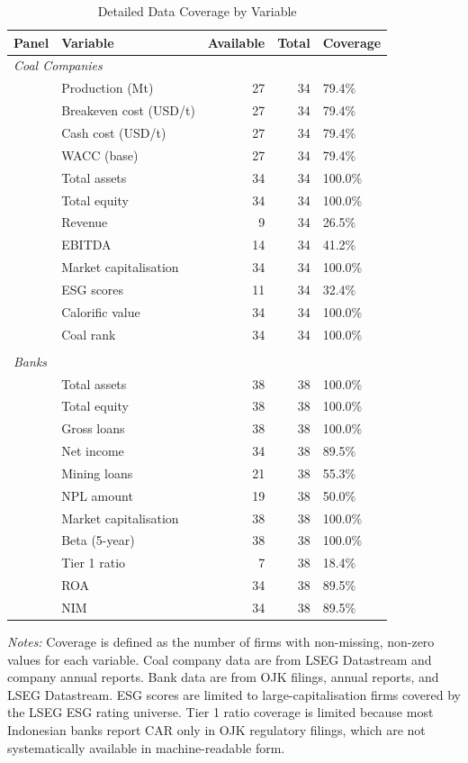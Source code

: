 \begin{table}[htbp]
\centering
\caption{Detailed Data Coverage by Variable}
\label{tab:data_coverage_detail_full}
\footnotesize
\begin{tabular}{llrrl}
\toprule
Panel & Variable & Available & Total & Coverage \\
\midrule
\multicolumn{5}{l}{\textit{Coal Companies}} \\[2pt]
 & Production (Mt) & 27 & 34 & 79.4\% \\
 & Breakeven cost (USD/t) & 27 & 34 & 79.4\% \\
 & Cash cost (USD/t) & 27 & 34 & 79.4\% \\
 & WACC (base) & 27 & 34 & 79.4\% \\
 & Total assets & 34 & 34 & 100.0\% \\
 & Total equity & 34 & 34 & 100.0\% \\
 & Revenue & 9 & 34 & 26.5\% \\
 & EBITDA & 14 & 34 & 41.2\% \\
 & Market capitalisation & 34 & 34 & 100.0\% \\
 & ESG scores & 11 & 34 & 32.4\% \\
 & Calorific value & 34 & 34 & 100.0\% \\
 & Coal rank & 34 & 34 & 100.0\% \\
\\[4pt]
\multicolumn{5}{l}{\textit{Banks}} \\[2pt]
 & Total assets & 38 & 38 & 100.0\% \\
 & Total equity & 38 & 38 & 100.0\% \\
 & Gross loans & 38 & 38 & 100.0\% \\
 & Net income & 34 & 38 & 89.5\% \\
 & Mining loans & 21 & 38 & 55.3\% \\
 & NPL amount & 19 & 38 & 50.0\% \\
 & Market capitalisation & 38 & 38 & 100.0\% \\
 & Beta (5-year) & 38 & 38 & 100.0\% \\
 & Tier 1 ratio & 7 & 38 & 18.4\% \\
 & ROA & 34 & 38 & 89.5\% \\
 & NIM & 34 & 38 & 89.5\% \\
\bottomrule
\end{tabular}

\smallskip
\noindent \textit{Notes:} Coverage is defined as the number of firms with non-missing, non-zero values for each variable. Coal company data are from LSEG Datastream and company annual reports. Bank data are from OJK filings, annual reports, and LSEG Datastream. ESG scores are limited to large-capitalisation firms covered by the LSEG ESG rating universe. Tier 1 ratio coverage is limited because most Indonesian banks report CAR only in OJK regulatory filings, which are not systematically available in machine-readable form.
\end{table}


